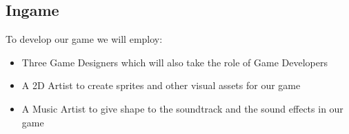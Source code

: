 \subsection{Ingame}

To develop our game we will employ:

\begin{itemize}
	\item Three Game Designers which will also take the role of Game Developers 
	\item A 2D Artist to create sprites and other visual assets for our game
	\item A Music Artist to give shape to the soundtrack and the sound effects in our game
\end{itemize}